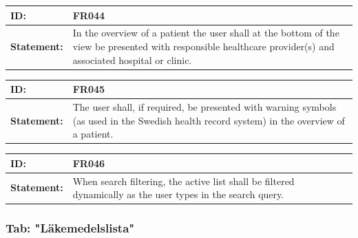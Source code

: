 \documentclass{scrreprt}
\begin{document}
\begin{center}
\begin{tabularx}{\linewidth}{| l | X |}
 \hline
 \textbf{ID:} & FR044  \\ 
 \hline
 \textbf{Statement:} & In the overview of a patient the user shall at the bottom of the view be presented with responsible healthcare provider(s) and associated hospital or clinic.
 \\ 
 \hline
\end{tabularx}

\begin{tabularx}{\linewidth}{| l | X |}
 \hline
 \textbf{ID:} & FR045  \\ 
 \hline
 \textbf{Statement:} & The user shall, if required, be presented with warning symbols (as used in the Swedish health record system) in the overview of a patient.
 \\ 
 \hline
\end{tabularx}

\begin{tabularx}{\linewidth}{| l | X |}
 \hline
 \textbf{ID:} & FR046  \\ 
 \hline
 \textbf{Statement:} & When search filtering, the active list shall be filtered dynamically as the user types in the search query.
 \\ 
 \hline
\end{tabularx}

\end{center}

\subsubsection{Tab: "Läkemedelslista"}
\end{document}
